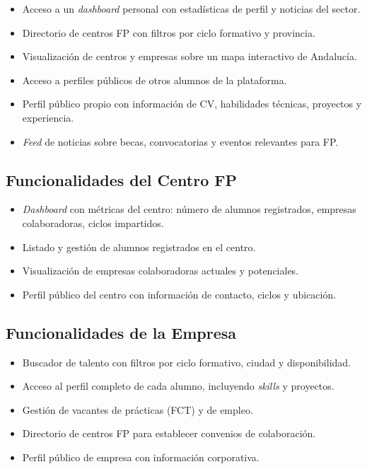 \documentclass[12pt, a4paper]{report}
\begin{document}
\begin{itemize}
  \item Acceso a un \emph{dashboard} personal con estadísticas de perfil y noticias del sector.
  \item Directorio de centros FP con filtros por ciclo formativo y provincia.
  \item Visualización de centros y empresas sobre un mapa interactivo de Andalucía.
  \item Acceso a perfiles públicos de otros alumnos de la plataforma.
  \item Perfil público propio con información de CV, habilidades técnicas, proyectos y experiencia.
  \item \emph{Feed} de noticias sobre becas, convocatorias y eventos relevantes para FP.
\end{itemize}

\subsection{Funcionalidades del Centro FP}

\begin{itemize}
  \item \emph{Dashboard} con métricas del centro: número de alumnos registrados, empresas
        colaboradoras, ciclos impartidos.
  \item Listado y gestión de alumnos registrados en el centro.
  \item Visualización de empresas colaboradoras actuales y potenciales.
  \item Perfil público del centro con información de contacto, ciclos y ubicación.
\end{itemize}

\subsection{Funcionalidades de la Empresa}

\begin{itemize}
  \item Buscador de talento con filtros por ciclo formativo, ciudad y disponibilidad.
  \item Acceso al perfil completo de cada alumno, incluyendo \emph{skills} y proyectos.
  \item Gestión de vacantes de prácticas (FCT) y de empleo.
  \item Directorio de centros FP para establecer convenios de colaboración.
  \item Perfil público de empresa con información corporativa.
\end{itemize}
\end{document}
